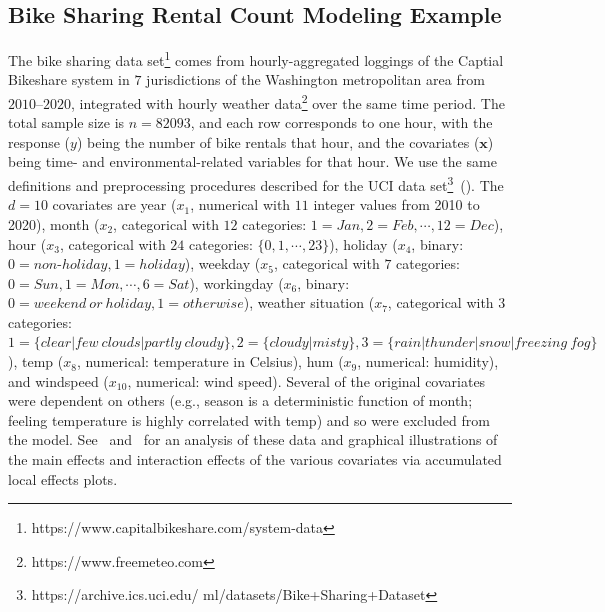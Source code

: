 \documentclass[twoside,11pt]{article}
\begin{document}
\subsection{Bike Sharing Rental Count Modeling Example}
\label{ss:bs_ds}

The bike sharing data set\footnote{https://www.capitalbikeshare.com/system-data} comes from hourly-aggregated loggings of the Captial Bikeshare system in $7$ jurisdictions of the Washington metropolitan area from $2010$--$2020$, integrated with hourly weather data\footnote{https://www.freemeteo.com} over the same time period. The total sample size is $n=82093$, and each row corresponds to one hour, with the response ($y$) being the number of bike rentals that hour, and the covariates ($\bm {x}$) being time- and environmental-related variables for that hour. We use the same definitions and preprocessing procedures described for the UCI data set\footnote{https://archive.ics.uci.edu/
ml/datasets/Bike+Sharing+Dataset}~(\cite{fanaee2014event}). The $d=10$ covariates are year ($x_1$, numerical with $11$ integer values from 2010 to 2020), month ($x_2$, categorical with $12$ categories: $1=Jan, 2=Feb, \cdots, 12=Dec$), hour ($x_3$, categorical with $24$ categories: $\{0,1,\cdots,23\}$), holiday ($x_4$, binary: $0=non\text{-}holiday,1=holiday$), weekday ($x_5$, categorical with $7$ categories: 
$0=Sun,1=Mon,\cdots,6=Sat$), workingday ($x_6$, binary: $0=weekend~or~holiday,1=otherwise$), weather situation ($x_7$, categorical with $3$ categories: $1 = \{clear|few~clouds|partly~cloudy\}, 2=\{cloudy|misty\}, 3=\{rain|thunder|snow|freezing~fog\}$), temp ($x_8$, numerical: temperature in Celsius), hum ($x_{9}$, numerical: humidity), and windspeed ($x_{10}$, numerical: wind speed). Several of the original covariates were dependent on others (e.g., season is a deterministic function of month; feeling temperature is highly correlated with temp) and so were excluded from the model. See~\cite{apley2016visualizing} and~\cite{apley2020visualizing} for an analysis of these data and graphical illustrations of the main effects and interaction effects of the various covariates via accumulated local effects plots.
\end{document}
